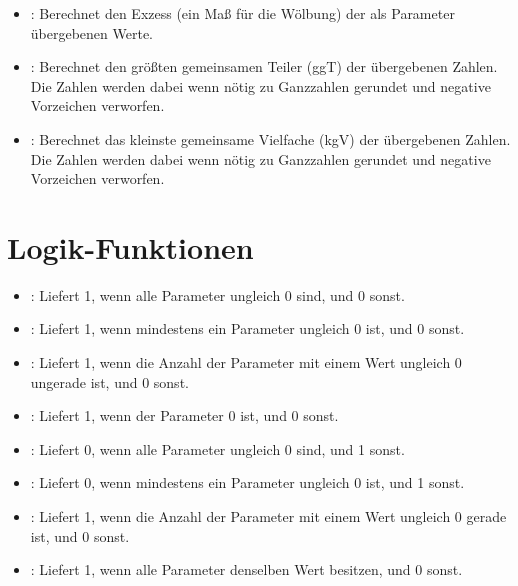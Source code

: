 \begin{itemize}
\item
{}:
Berechnet den Exzess (ein Maß für die Wölbung) der als Parameter übergebenen Werte.

\item
{}:
Berechnet den größten gemeinsamen Teiler (ggT) der übergebenen Zahlen. Die Zahlen werden dabei wenn nötig zu Ganzzahlen gerundet und negative Vorzeichen verworfen.
\item
{}:
Berechnet das kleinste gemeinsame Vielfache (kgV) der übergebenen Zahlen. Die Zahlen werden dabei wenn nötig zu Ganzzahlen gerundet und negative Vorzeichen verworfen.

\end{itemize}



\chapter{Logik-Funktionen}

\begin{itemize}

\item
{}:
Liefert 1, wenn alle Parameter ungleich 0 sind, und 0 sonst.

\item
{}:
Liefert 1, wenn mindestens ein Parameter ungleich 0 ist, und 0 sonst.

\item
{}:
Liefert 1, wenn die Anzahl der Parameter mit einem Wert ungleich 0 ungerade ist, und 0 sonst.

\item
{}:
Liefert 1, wenn der Parameter 0 ist, und 0 sonst.

\item
{}:
Liefert 0, wenn alle Parameter ungleich 0 sind, und 1 sonst.

\item
{}:
Liefert 0, wenn mindestens ein Parameter ungleich 0 ist, und 1 sonst.

\item
{}:
Liefert 1, wenn die Anzahl der Parameter mit einem Wert ungleich 0 gerade ist, und 0 sonst.

\item
{}:
Liefert 1, wenn alle Parameter denselben Wert besitzen, und 0 sonst.

\end{itemize}



